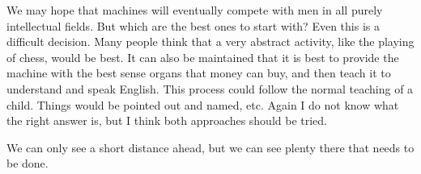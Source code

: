 \documentclass{article}
\begin{document}
We may hope that machines will eventually compete with men in all purely intellectual fields. But which are the best ones to start with? Even this is a difficult decision. Many people think that a very abstract activity, like the playing of chess, would be best. It can also be maintained that it is best to provide the machine with the best sense organs that money can buy, and then teach it to understand and speak English. This process could follow the normal teaching of a child. Things would be pointed out and named, etc. Again I do not know what the right answer is, but I think both approaches should be tried.

We can only see a short distance ahead, but we can see plenty there that needs to be done.
\end{document}
